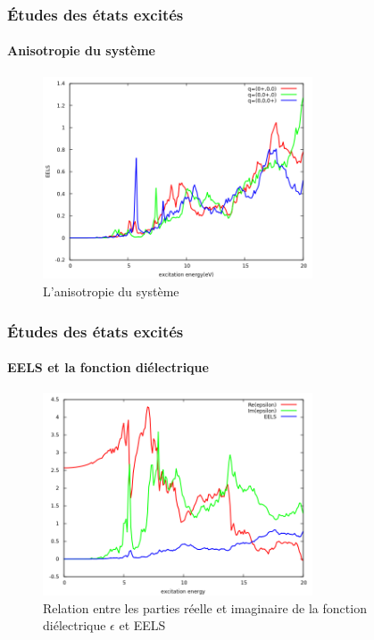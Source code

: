 \documentclass[a4paper, 12pt, twoside, titlepage, french]{beamer}
\begin{document}
\begin{frame}
\frametitle{Études des états excités}
\framesubtitle{Anisotropie du système}
\begin{figure}[!h]
    \centering
    \includegraphics[width=8cm]{anisotropy}
    \caption{L'anisotropie du système}\label{fig-anisotropie}
\end{figure}

\end{frame}

\begin{frame}
\frametitle{Études des états excités}
\framesubtitle{EELS et la fonction diélectrique}
\begin{figure}[!h]
    \centering
    \includegraphics[width=8cm]{epsilon_compare}
    \caption{Relation entre les parties réelle et imaginaire de la fonction diélectrique $\epsilon$ et EELS}\label{fig-epsilon_compare}
\end{figure}

\end{frame}
\end{document}
